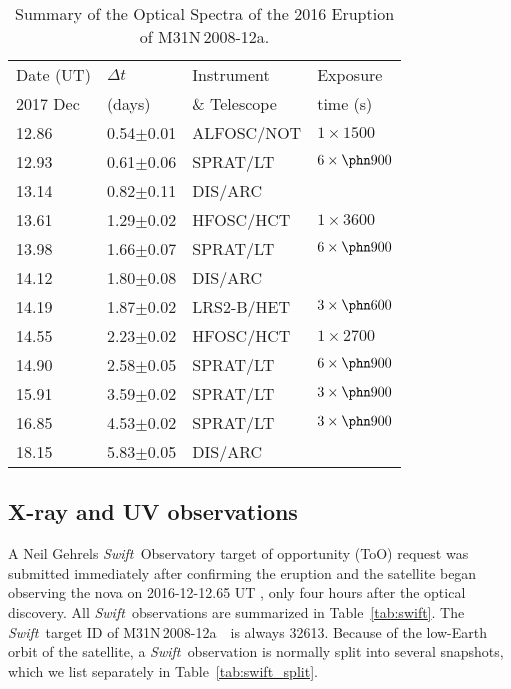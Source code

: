 \documentclass[twocolumn,tighten]{aastex6}
\def\swift{{\it Swift~}}
\def\nova{{M31N\,2008-12a~}}
\def\novak{{M31N\,2008-12a}}
\begin{document}
\begin{table}
\caption{Summary of the Optical Spectra of the 2016 Eruption of \novak.\label{tab:spec}}
\begin{center}
\begin{tabular}{llll}
\hline
Date (UT)&$\Delta t$ &Instrument & Exposure\\
2017 Dec & (days) & \& Telescope & time (s)\\
\hline
12.86 &0.54$\pm$0.01 &ALFOSC/NOT & $1\times1500$\\
12.93 &0.61$\pm$0.06 &SPRAT/LT & $6\times\phn900$ \\
13.14 &0.82$\pm$0.11 &DIS/ARC &\\
13.61 &1.29$\pm$0.02 &HFOSC/HCT & $1\times3600$\\
13.98 &1.66$\pm$0.07 &SPRAT/LT & $6\times\phn900$ \\
14.12 &1.80$\pm$0.08 &DIS/ARC &\\
14.19 &1.87$\pm$0.02 &LRS2-B/HET &$3\times\phn600$\\
14.55 &2.23$\pm$0.02 &HFOSC/HCT & $1\times2700$\\
14.90 &2.58$\pm$0.05 &SPRAT/LT & $6\times\phn900$ \\
15.91 &3.59$\pm$0.02 &SPRAT/LT & $3\times\phn900$ \\
16.85 &4.53$\pm$0.02 &SPRAT/LT & $3\times\phn900$ \\
18.15 &5.83$\pm$0.05 &DIS/ARC &\\
\hline
\end{tabular}
\end{center}
\end{table}

\subsection{X-ray and UV observations}\label{swift_data}

A Neil Gehrels \swift Observatory \citep{2004ApJ...611.1005G} target of opportunity (ToO) request was submitted immediately after confirming the eruption and the satellite began observing the nova on 2016-12-12.65 UT \citep[cf.][]{2016ATel.9853....1H}, only four hours after the optical discovery. All \swift observations are summarized in Table~\ref{tab:swift}. The \swift target ID of \nova\ is always 32613. Because of the low-Earth orbit of the satellite, a \swift observation is normally split into several snapshots, which we list separately in Table~\ref{tab:swift_split}.
\end{document}
